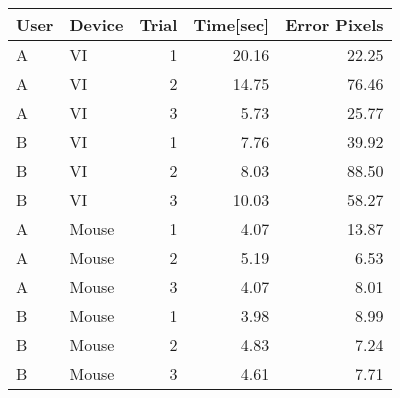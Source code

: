\begin{tabular}{llrrr}
 \toprule
 User & Device & Trial & Time[sec] & Error Pixels \\
 \midrule
 A	& VI	  & 1	& 20.16	& 22.25 \\
 A	& VI	  & 2	& 14.75	& 76.46 \\
 A	& VI	  & 3	& 5.73	& 25.77 \\
 B	& VI	  & 1	& 7.76	& 39.92 \\
 B	& VI	  & 2	& 8.03	& 88.50 \\
 B	& VI	  & 3	& 10.03	& 58.27 \\
 A	& Mouse	& 1	& 4.07	& 13.87 \\
 A	& Mouse	& 2	& 5.19	& 6.53 \\
 A	& Mouse	& 3	& 4.07	& 8.01 \\
 B	& Mouse	& 1	& 3.98	& 8.99 \\
 B	& Mouse	& 2	& 4.83	& 7.24 \\
 B	& Mouse	& 3	& 4.61	& 7.71 \\
 \bottomrule
\end{tabular}
